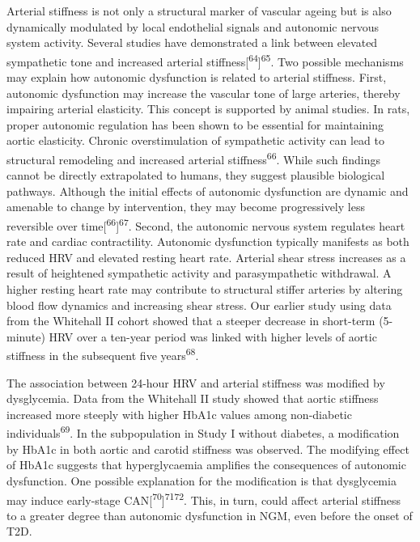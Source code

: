 \documentclass[
  a4paper,
  headsepline=true,
  open=any]{scrbook}
\begin{document}
Arterial stiffness is not only a structural marker of vascular ageing
but is also dynamically modulated by local endothelial signals and
autonomic nervous system activity. Several studies have demonstrated a
link between elevated sympathetic tone and increased arterial
stiffness{[}\textsuperscript{64}{]}\textsuperscript{65}. Two possible
mechanisms may explain how autonomic dysfunction is related to arterial
stiffness. First, autonomic dysfunction may increase the vascular tone
of large arteries, thereby impairing arterial elasticity. This concept
is supported by animal studies. In rats, proper autonomic regulation has
been shown to be essential for maintaining aortic elasticity. Chronic
overstimulation of sympathetic activity can lead to structural
remodeling and increased arterial stiffness\textsuperscript{66}. While
such findings cannot be directly extrapolated to humans, they suggest
plausible biological pathways. Although the initial effects of autonomic
dysfunction are dynamic and amenable to change by intervention, they may
become progressively less reversible over
time{[}\textsuperscript{66}{]}\textsuperscript{67}. Second, the
autonomic nervous system regulates heart rate and cardiac contractility.
Autonomic dysfunction typically manifests as both reduced HRV and
elevated resting heart rate. Arterial shear stress increases as a result
of heightened sympathetic activity and parasympathetic withdrawal. A
higher resting heart rate may contribute to structural stiffer arteries
by altering blood flow dynamics and increasing shear stress. Our earlier
study using data from the Whitehall II cohort showed that a steeper
decrease in short-term (5-minute) HRV over a ten-year period was linked
with higher levels of aortic stiffness in the subsequent five
years\textsuperscript{68}.

The association between 24-hour HRV and arterial stiffness was modified
by dysglycemia. Data from the Whitehall II study showed that aortic
stiffness increased more steeply with higher HbA1c values among
non-diabetic individuals\textsuperscript{69}. In the subpopulation in
Study I without diabetes, a modification by HbA1c in both aortic and
carotid stiffness was observed. The modifying effect of HbA1c suggests
that hyperglycaemia amplifies the consequences of autonomic dysfunction.
One possible explanation for the modification is that dysglycemia may
induce early-stage
CAN{[}\textsuperscript{70}{]}\textsuperscript{71}\textsuperscript{72}.
This, in turn, could affect arterial stiffness to a greater degree than
autonomic dysfunction in NGM, even before the onset of T2D.
\end{document}
